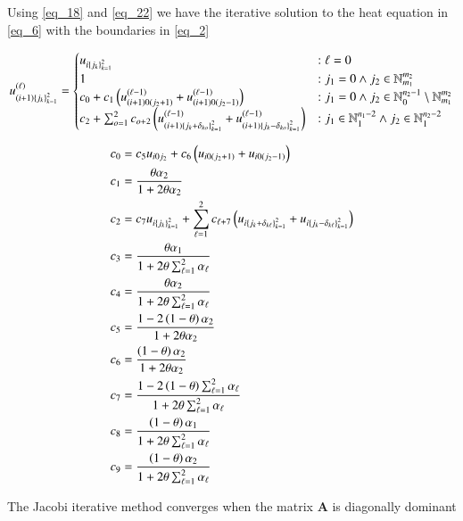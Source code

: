 \documentclass[11pt,english,a4paper]{article}
\begin{document}
\begin{flushleft}
Using \eqref{eq_18} and \eqref{eq_22} we have the iterative solution to the heat equation in \eqref{eq_6} with the boundaries in \eqref{eq_2}

\begin{align}
u_{(i+1)\left\lbrace{j_k}\right\rbrace_{k=1}^2}^{(\ell)} = \begin{cases}
u_{i\left\lbrace{j_k}\right\rbrace_{k=1}^2} &: \ell = 0 \\
1 &: j_1=0 \wedge j_2\in\mathbb{N}_{m_1}^{m_2} \\
c_0 + c_1\left({u_{(i+1)0(j_2+1)}^{(\ell-1)}+u_{(i+1)0(j_2-1)}^{(\ell-1)}}\right) &: j_1=0 \wedge j_2\in\mathbb{N}_0^{n_2-1} \setminus\mathbb{N}_{m_1}^{m_2} \\
c_2 + \sum_{o=1}^2 c_{o+2}\left({u_{(i+1)\left\lbrace{j_k+\delta_{ko}}\right\rbrace_{k=1}^2}^{(\ell-1)}+u_{(i+1)\left\lbrace{j_k-\delta_{ko}}\right\rbrace_{k=1}^2}^{(\ell-1)}}\right) &: j_1\in \mathbb{N}_{1}^{n_1-2} \wedge j_2\in\mathbb{N}_1^{n_2-2} 
\end{cases} 
\label{eq_23}
\end{align}

\begin{align}
c_0 &= c_5 u_{i0j_2} + c_6\left({u_{i0(j_2+1)} + u_{i0(j_2-1)}}\right)
\label{eq_24}\\
c_1 &= \frac{\theta \alpha_2}{1+2\theta\alpha_2}
\label{eq_25}\\
c_2 &= c_7 u_{i\left\lbrace{j_k}\right\rbrace_{k=1}^2} + \sum_{\ell=1}^2 c_{\ell+7} \left({u_{i\left\lbrace{j_k+\delta_{k\ell}}\right\rbrace_{k=1}^2} + u_{i\left\lbrace{j_k-\delta_{k\ell}}\right\rbrace_{k=1}^2}}\right)
\label{eq_26}\\
c_3 &= \frac{\theta \alpha_1}{1+ 2\theta \sum_{\ell = 1}^2 \alpha_\ell}
\label{eq_27}\\
c_4 &= \frac{\theta \alpha_2}{1+ 2\theta \sum_{\ell = 1}^2 \alpha_\ell}
\label{eq_28}\\
c_5 &= \frac{1-2\left({1-\theta}\right)\alpha_2}{1+2\theta \alpha_2} 
\label{eq_29}\\
c_6 &= \frac{\left({1-\theta}\right)\alpha_2}{1+2\theta \alpha_2} 
\label{eq_30}\\
c_7 &= \frac{1-2\left({1-\theta}\right)\sum_{\ell = 1}^2 \alpha_\ell}{1+ 2\theta \sum_{\ell = 1}^2 \alpha_\ell}
\label{eq_31}\\
c_8 &= \frac{\left({1-\theta}\right)\alpha_1}{1+ 2\theta \sum_{\ell = 1}^2 \alpha_\ell}
\label{eq_32}\\
c_9 &= \frac{\left({1-\theta}\right)\alpha_2}{1+ 2\theta \sum_{\ell = 1}^2 \alpha_\ell}
\label{eq_33}
\end{align}

The Jacobi iterative method converges when the matrix $\textbf{A}$ is diagonally dominant 


\end{flushleft}
\end{document}
